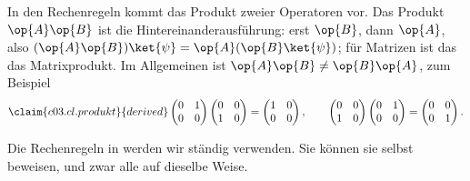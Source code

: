 In den Rechenregeln kommt das Produkt zweier Operatoren vor. Das Produkt $\op{A}\op{B}$ ist die
Hintereinanderausführung: erst $\op{B}$, dann $\op{A}$, also
$(\op{A}\op{B})\ket{\psi} = \op{A}(\op{B}\ket{\psi})$; für Matrizen ist das das Matrixprodukt.
Im Allgemeinen ist $\op{A}\op{B} \neq \op{B}\op{A}$, zum Beispiel
\begin{equation}\label{c03.eq.produkt}\claim{c03.cl.produkt}{derived}
  \begin{pmatrix} 0 & 1 \\ 0 & 0 \end{pmatrix} \begin{pmatrix} 0 & 0 \\ 1 & 0 \end{pmatrix}
  = \begin{pmatrix} 1 & 0 \\ 0 & 0 \end{pmatrix} ,
  \qquad
  \begin{pmatrix} 0 & 0 \\ 1 & 0 \end{pmatrix} \begin{pmatrix} 0 & 1 \\ 0 & 0 \end{pmatrix}
  = \begin{pmatrix} 0 & 0 \\ 0 & 1 \end{pmatrix} .
\end{equation}

Die Rechenregeln in  werden wir ständig verwenden. Sie können sie selbst beweisen,
und zwar alle auf dieselbe Weise.

